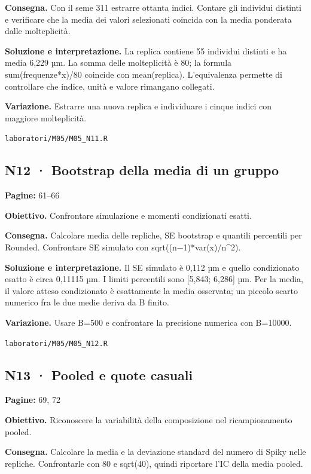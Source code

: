 \documentclass[11pt,a4paper]{article}
\begin{document}
\textbf{Consegna.} Con il seme 311 estrarre ottanta indici. Contare gli individui distinti e verificare che la media dei valori selezionati coincida con la media ponderata dalle molteplicità.

\textbf{Soluzione e interpretazione.} La replica contiene 55 individui distinti e ha media 6,229 µm. La somma delle molteplicità è 80; la formula sum(frequenze*x)/80 coincide con mean(replica). L’equivalenza permette di controllare che indice, unità e valore rimangano collegati.

\textbf{Variazione.} Estrarre una nuova replica e individuare i cinque indici con maggiore molteplicità.

\texttt{laboratori/M05/M05\_N11.R}

\subsection*{N12 · Bootstrap della media di un gruppo}

\textbf{Pagine:} 61–66

\textbf{Obiettivo.} Confrontare simulazione e momenti condizionati esatti.

\textbf{Consegna.} Calcolare media delle repliche, SE bootstrap e quantili percentili per Rounded. Confrontare SE simulato con sqrt((n−1)*var(x)/n\textasciicircum{}2).

\textbf{Soluzione e interpretazione.} Il SE simulato è 0,112 µm e quello condizionato esatto è circa 0,11115 µm. I limiti percentili sono [5,843; 6,286] µm. Per la media, il valore atteso condizionato è esattamente la media osservata; un piccolo scarto numerico fra le due medie deriva da B finito.

\textbf{Variazione.} Usare B=500 e confrontare la precisione numerica con B=10000.

\texttt{laboratori/M05/M05\_N12.R}

\newpage

\subsection*{N13 · Pooled e quote casuali}

\textbf{Pagine:} 69, 72

\textbf{Obiettivo.} Riconoscere la variabilità della composizione nel ricampionamento pooled.

\textbf{Consegna.} Calcolare la media e la deviazione standard del numero di Spiky nelle repliche. Confrontarle con 80 e sqrt(40), quindi riportare l’IC della media pooled.
\end{document}
